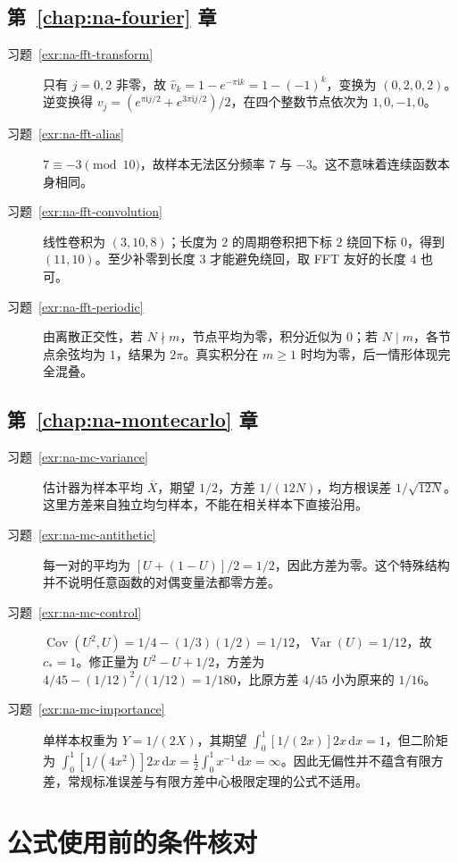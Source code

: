 \documentclass[UTF8,12pt,a4paper,fontset=fandol]{ctexbook}
\begin{document}
\section{第~\ref{chap:na-fourier} 章}
\begin{description}
\item[习题~\ref{exr:na-fft-transform}] 只有 $j=0,2$ 非零，故 $\widehat v_k=1-e^{-\pi\mathrm i k}=1-(-1)^k$，变换为 $(0,2,0,2)$。逆变换得 $v_j=(e^{\pi\mathrm i j/2}+e^{3\pi\mathrm i j/2})/2$，在四个整数节点依次为 $1,0,-1,0$。
\item[习题~\ref{exr:na-fft-alias}] $7\equiv-3\pmod{10}$，故样本无法区分频率 $7$ 与 $-3$。这不意味着连续函数本身相同。
\item[习题~\ref{exr:na-fft-convolution}] 线性卷积为 $(3,10,8)$；长度为 $2$ 的周期卷积把下标 $2$ 绕回下标 $0$，得到 $(11,10)$。至少补零到长度 $3$ 才能避免绕回，取 FFT 友好的长度 $4$ 也可。
\item[习题~\ref{exr:na-fft-periodic}] 由离散正交性，若 $N\nmid m$，节点平均为零，积分近似为 $0$；若 $N\mid m$，各节点余弦均为 $1$，结果为 $2\pi$。真实积分在 $m\ge1$ 时均为零，后一情形体现完全混叠。
\end{description}

\section{第~\ref{chap:na-montecarlo} 章}
\begin{description}
\item[习题~\ref{exr:na-mc-variance}] 估计器为样本平均 $\overline X$，期望 $1/2$，方差 $1/(12N)$，均方根误差 $1/\sqrt{12N}$。这里方差来自独立均匀样本，不能在相关样本下直接沿用。
\item[习题~\ref{exr:na-mc-antithetic}] 每一对的平均为 $[U+(1-U)]/2=1/2$，因此方差为零。这个特殊结构并不说明任意函数的对偶变量法都零方差。
\item[习题~\ref{exr:na-mc-control}] $\operatorname{Cov}(U^2,U)=1/4-(1/3)(1/2)=1/12$，$\operatorname{Var}(U)=1/12$，故 $c_*=1$。修正量为 $U^2-U+1/2$，方差为 $4/45-(1/12)^2/(1/12)=1/180$，比原方差 $4/45$ 小为原来的 $1/16$。
\item[习题~\ref{exr:na-mc-importance}] 单样本权重为 $Y=1/(2X)$，其期望 $\int_0^1[1/(2x)]2x\,\mathrm dx=1$，但二阶矩为 $\int_0^1[1/(4x^2)]2x\,\mathrm dx=\tfrac12\int_0^1x^{-1}\,\mathrm dx=\infty$。因此无偏性并不蕴含有限方差，常规标准误差与有限方差中心极限定理的公式不适用。
\end{description}

\chapter{公式使用前的条件核对}
\label{app:na-conditions}
\end{document}
